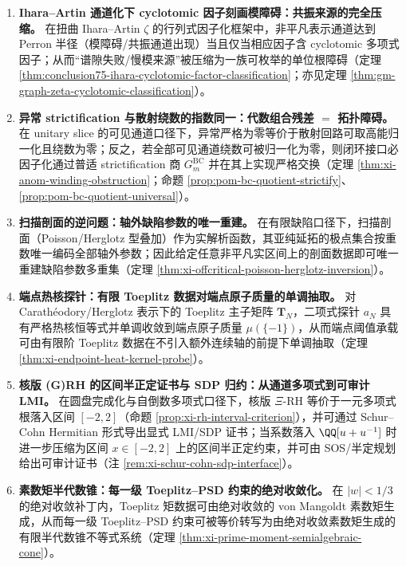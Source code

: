 \begin{enumerate}
  \item \textbf{Ihara--Artin 通道化下 cyclotomic 因子刻画模障碍：共振来源的完全压缩。}
  在扭曲 Ihara--Artin \(\zeta\) 的行列式因子化框架中，非平凡表示通道达到 Perron 半径（模障碍/共振通道出现）当且仅当相应因子含 cyclotomic 多项式因子；从而“谱隙失败/慢模来源”被压缩为一族可枚举的单位根障碍（定理 \ref{thm:conclusion75-ihara-cyclotomic-factor-classification}；亦见定理 \ref{thm:gm-graph-zeta-cyclotomic-classification}）。

  \item \textbf{异常 strictification 与散射绕数的指数同一：代数组合残差 \(=\) 拓扑障碍。}
  在 unitary slice 的可见通道口径下，异常严格为零等价于散射回路可取高能归一化且绕数为零；反之，若全部可见通道绕数可被归一化为零，则闭环接口必因子化通过普适 strictification 商 \(G^{\mathrm{BC}}_m\) 并在其上实现严格交换（定理 \ref{thm:xi-anom-winding-obstruction}；命题 \ref{prop:pom-bc-quotient-strictify}、\ref{prop:pom-bc-quotient-universal}）。

  \item \textbf{扫描剖面的逆问题：轴外缺陷参数的唯一重建。}
  在有限缺陷口径下，扫描剖面（Poisson/Herglotz 型叠加）作为实解析函数，其亚纯延拓的极点集合按重数唯一编码全部轴外参数；因此给定任意非平凡实区间上的剖面数据即可唯一重建缺陷参数多重集（定理 \ref{thm:xi-offcritical-poisson-herglotz-inversion}）。

  \item \textbf{端点热核探针：有限 Toeplitz 数据对端点原子质量的单调抽取。}
  对 Carath\'eodory/Herglotz 表示下的 Toeplitz 主子矩阵 \(\mathbf{T}_N\)，二项式探针 \(a_N\) 具有严格热核恒等式并单调收敛到端点原子质量 \(\mu(\{-1\})\)，从而端点阈值承载可由有限阶 Toeplitz 数据在不引入额外连续轴的前提下单调抽取（定理 \ref{thm:xi-endpoint-heat-kernel-probe}）。

  \item \textbf{核版 (G)RH 的区间半正定证书与 SDP 归约：从通道多项式到可审计 LMI。}
  在圆盘完成化与自倒数多项式口径下，核版 \(\Xi\)-RH 等价于一元多项式根落入区间 \([-2,2]\)（命题 \ref{prop:xi-rh-interval-criterion}），并可通过 Schur--Cohn Hermitian 形式导出显式 LMI/SDP 证书；当系数落入 \(\QQ[u+u^{-1}]\) 时进一步压缩为区间 \(x\in[-2,2]\) 上的区间半正定约束，并可由 SOS/半定规划给出可审计证书（注 \ref{rem:xi-schur-cohn-sdp-interface}）。

  \item \textbf{素数矩半代数锥：每一级 Toeplitz--PSD 约束的绝对收敛化。}
  在 \(|w|<1/3\) 的绝对收敛补丁内，Toeplitz 矩数据可由绝对收敛的 von Mangoldt 素数矩生成，从而每一级 Toeplitz--PSD 约束可被等价转写为由绝对收敛素数矩生成的有限半代数锥不等式系统（定理 \ref{thm:xi-prime-moment-semialgebraic-cone}）。


\end{enumerate}
